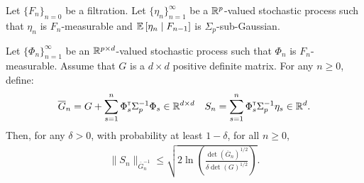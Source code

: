 \documentclass{article}
\begin{document}
\begin{proposition}
\label{prop:concentration}
Let $\{F_n\}_{n=0}$ be a filtration.
Let $\{\eta_n\}_{n=1}^\infty$ be a $\mathbb{R}^p$-valued stochastic process such that $\eta_n$ is $F_n$-measurable and $\operatorname*{\mathbb{E}}\left[\eta_n\;\middle|\; F_{n-1}\right]$ is $\Sigma_p$-sub-Gaussian.

Let $\{\Phi_n\}_{n=1}^\infty$ be an $\mathbb{R}^{p\times d}$-valued stochastic process such that $\Phi_n$ is $F_n$-measurable. Assume that $G$ is a $d\times d$ positive definite matrix. For any $n\geq 0$, define:
\begin{equation*}
    \overline{G}_n = G + \sum_{s=1}^n \Phi_s^{\mathsf{\scriptscriptstyle T}} \Sigma_p^{-1} \Phi_s \in \mathbb{R}^{d\times d} \quad S_n = \sum_{s=1}^n \Phi_s^{\mathsf{\scriptscriptstyle T}}\Sigma_p^{-1}\eta_s \in \mathbb{R}^{d}.
\end{equation*}
Then, for any $\delta>0$, with probability at least $1-\delta$, for all $n\geq0$,
\begin{align*}
\| S_n \|_{\overline{G}_n^{-1}} \leq \sqrt{2\ln \left(\frac{\det\left(\overline{G}_n\right)^{1/2}}{\delta\det(G)^{1/2}}\right)}.
\end{align*}
\end{proposition}
\end{document}
